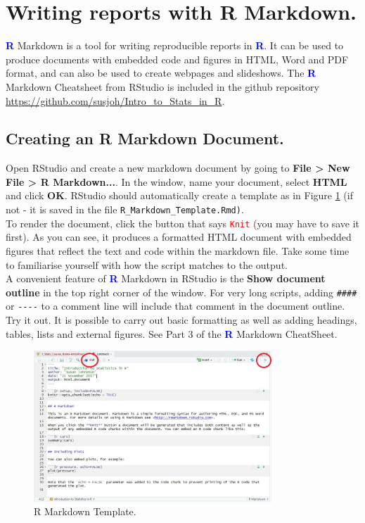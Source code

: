 \documentclass[a4paper,12pt]{article}
\newcommand\boldblue[1]{\textcolor{blue}{\textbf{#1}}}
\newcommand\code[1]{\textcolor{red}{\texttt{#1}}}
\begin{document}
\section {Writing reports with R Markdown.}


\boldblue{R} Markdown is a tool for writing reproducible reports in \boldblue{R}. It can be used to produce documents with embedded code and figures in HTML, Word and PDF format, and can also be used to create webpages and slideshows. The  \boldblue{R} Markdown Cheatsheet from RStudio is included in the github repository \url{https://github.com/susjoh/Intro_to_Stats_in_R}.

\subsection{Creating an R Markdown Document.}

Open RStudio and create a new markdown document by going to \textbf{File > New File > R Markdown...}. In the window, name your document, select \textbf{HTML} and click \textbf{OK}. RStudio should automatically create a template as in Figure \ref{fig:MarkdownTemplate} (if not - it is saved in the file \texttt{R\_Markdown\_Template.Rmd)}. \\

To render the document, click the button that says \code{Knit} (you may have to save it first). As you can see, it produces a formatted HTML document with embedded figures that reflect the text and code within the markdown file. Take some time to familiarise yourself with how the script matches to the output. \\

A convenient feature of \boldblue{R} Markdown in RStudio is the \textbf{Show document outline} in the top right corner of the window. For very long scripts, adding \verb!####! or \verb!----! to a comment line will include that comment in the document outline. Try it out. It is possible to carry out basic formatting as well as adding headings, tables, lists and external figures. See Part 3 of the \boldblue{R} Markdown CheatSheet. \\

\begin{figure}[h]
\centering 
\includegraphics[width=0.8\textwidth]{figs/MarkdownTemplate.JPG}
\caption{R Markdown Template.}
\label{fig:MarkdownTemplate}
\end{figure} 
\end{document}
